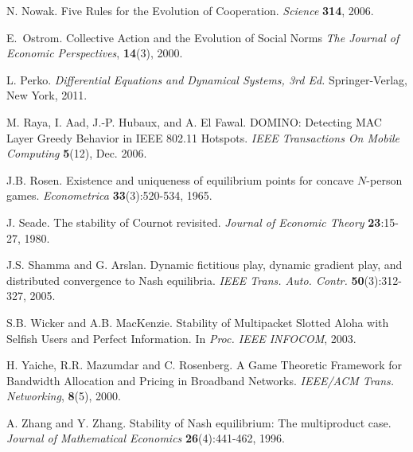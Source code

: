 \documentclass[12pt,onecolumn,draftcls]{IEEEtran}
\begin{document}
\begin{thebibliography}{9}
N. Nowak. 
Five Rules for the Evolution of Cooperation.
{\em Science} {\bf 314}, 2006.



E.~Ostrom.
Collective Action and the Evolution of Social Norms
{\em The Journal of Economic Perspectives}, 
{\bf 14}(3), 2000.

L. Perko.
{\em Differential Equations and Dynamical Systems, 3rd Ed.}
Springer-Verlag, New York, 2011.




M. Raya, I. Aad, J.-P. Hubaux, and A. El Fawal.
DOMINO: Detecting MAC Layer Greedy Behavior in IEEE 802.11 Hotspots.
{\em IEEE Transactions On Mobile Computing}
{\bf 5}(12), Dec. 2006.

J.B. Rosen. Existence and uniqueness of equilibrium points for concave
$N$-person games. {\em Econometrica} {\bf 33}(3):520-534, 1965.









J. Seade.
The stability of Cournot revisited.
{\em Journal of Economic Theory}
{\bf 23}:15-27, 1980.

J.S. Shamma and G. Arslan. 
Dynamic fictitious play, dynamic gradient play, and distributed 
convergence to Nash equilibria. 
{\em IEEE Trans. Auto. Contr.} {\bf 50}(3):312-327, 2005.



S.B. Wicker  and A.B. MacKenzie.
Stability of Multipacket Slotted Aloha with Selfish Users and Perfect 
Information.
In {\em Proc. IEEE INFOCOM}, 2003.







H. Yaiche, R.R. Mazumdar and C. Rosenberg.
A Game Theoretic Framework for Bandwidth
Allocation and Pricing in Broadband Networks.
{\em IEEE/ACM Trans. Networking}, {\bf 8}(5), 2000.

A. Zhang and Y. Zhang.
Stability of Nash equilibrium: The multiproduct case.
  {\em Journal of Mathematical Economics}
{\bf 26}(4):441-462, 1996.
\end{thebibliography}
\end{document}
